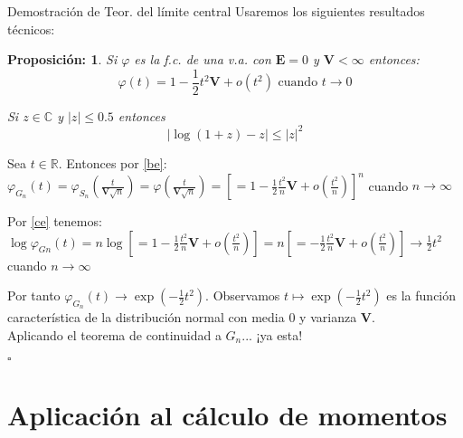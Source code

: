 \documentclass{beamer}
\newcommand{\R}{\mathbb{R}}
\newcommand{\vp}{\varphi}
\newcommand{\E}{\mathbf{E}}
\newcommand{\V}{\mathbf{V}}
\newtheorem{prop}{Proposición:}
\begin{document}
\begin{frame}{Demostración de Teor. del límite central}
	Usaremos los siguientes resultados técnicos:
	
	\begin{prop}
		Si $\vp$ es la f.c. de una v.a. con $ \E=0$ y $\V < \infty$  entonces: 
		\begin{equation}\label{be}
		\vp (t) =1 - \frac{1}{2} t^{2} \V   + o(t^{2}) \mbox{ cuando } t \longrightarrow 0
		\end{equation}
		
		Si $z \in \mathbb{C}$ y $ |z| \leq 0.5 $ entonces 
		\begin{equation}\label{ce}
		|\log (1+z)-z| \leq |z|^{2}
		\end{equation}
		
	\end{prop}
		
	Sea $t \in \R$. Entonces por \ref{be}:\\
	$ \vp_{G_{n}}(t) = \vp _{S_{n}} \left( \frac{t}{\V \sqrt{n}} \right) = \vp \left( \frac{t}{\V \sqrt{n}} \right) = \left[ =1 - \frac{1}{2} \frac{t^{2} }{n} \V   + o(\frac{t^{2}}{n})  \right] ^{n}  $ cuando $n \longrightarrow \infty $
	
\end{frame}


\begin{frame}
	Por \ref{ce} tenemos:\\
	$ \log \vp _{G{n}} (t) = n \log \left[ =1 - \frac{1}{2} \frac{t^{2} }{n} \V   + o(\frac{t^{2}}{n})  \right] = n \left[ = - \frac{1}{2} \frac{t^{2} }{n} \V   + o(\frac{t^{2}}{n})  \right] \longrightarrow \frac{1}{2} t^{2} $ cuando $n \longrightarrow \infty$
	
	Por tanto $\vp_{G_{n}}(t) \longrightarrow \exp \left(-\frac{1}{2} t^{2}\right) $. Observamos $t \mapsto \exp \left(-\frac{1}{2} t^{2}\right)$ es la función característica de la distribución normal con media $0$ y varianza $\V$. \\
	Aplicando el teorema de continuidad a $G_{n}$... ¡ya esta!
	\begin{flushright}
		$ \square$
	\end{flushright}
\end{frame}


\section{Aplicación al cálculo de momentos}
	
\end{document}
